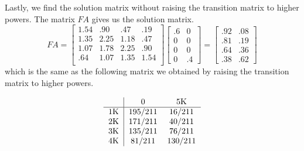 \begin{solution}
    Lastly, we find the solution matrix without raising the transition matrix to higher powers. The matrix $FA$ gives us the solution matrix.
    \[
        FA = \begin{bmatrix}
            1.54 & .90  & .47  & .19  \\
            1.35 & 2.25 & 1.18 & .47  \\
            1.07 & 1.78 & 2.25 & .90  \\
            .64  & 1.07 & 1.35 & 1.54 \\
        \end{bmatrix}
        \begin{bmatrix}
            .6 & 0  \\
            0  & 0  \\
            0  & 0  \\
            0  & .4
        \end{bmatrix}=
        \begin{bmatrix}
            .92 & .08 \\
            .81 & .19 \\
            .64 & .36 \\
            .38 & .62
        \end{bmatrix}
    \]
    which is the same as the following matrix we obtained by raising the transition matrix to higher powers.

    \[ \begin{tabular}{c|cc}
               & 0       & 5K      \\
            \hline
            1K & 195/211 & 16/211  \\
            2K & 171/211 & 40/211  \\
            3K & 135/211 & 76/211  \\
            4K & 81/211  & 130/211
        \end{tabular}
    \]

\end{solution}

